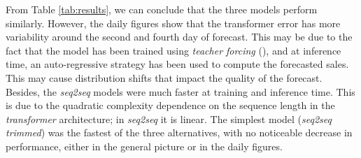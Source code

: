 \documentclass{elsarticle}
\begin{document}
	From Table \ref{tab:results}, we can conclude that the three models perform similarly. However, the daily figures show that the transformer error has more variability around the second and fourth day of forecast. This may be due to the fact that the model has been trained using \textit{teacher forcing} (\cite{williams1989, goyal2016}), and at inference time, an auto-regressive strategy has been used to compute the forecasted sales. This may cause distribution shifts that impact the quality of the forecast.  Besides, the \textit{seq2seq} models were much faster at training and inference time. This is due to the quadratic complexity dependence on the sequence length in the \textit{transformer} architecture; in \textit{seq2seq} it is linear. The simplest model (\textit{seq2seq trimmed}) was the fastest of the three alternatives, with no noticeable decrease in performance, either in the general picture or in the daily figures.
\end{document}
